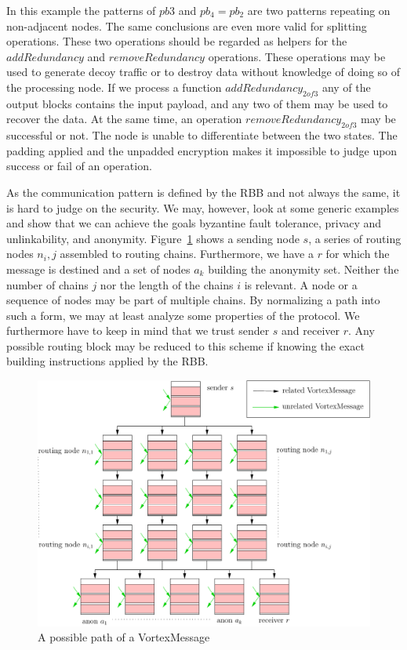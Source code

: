 \documentclass[acmsmall, screen, final, natbib=false]{acmart}
\begin{document}
	In this example the patterns of $pb3$ and $pb_4=pb_2$ are two patterns repeating on non-adjacent nodes. The same conclusions are even more valid for splitting operations. These two operations should be regarded as helpers for the $addRedundancy$ and $removeRedundancy$ operations. These operations may be used to generate decoy traffic or to destroy data without knowledge of doing so of the processing node. If we process a function $addRedundancy_{2 of 3}$ any of the output blocks contains the input payload, and any two of them may be used to recover the data. At the same time, an operation $removeRedundancy_{2 of 3}$ may be successful or not. The node is unable to differentiate between the two states. The padding applied and the unpadded encryption makes it impossible to judge upon success or fail of an operation.
	
	As the communication pattern is defined by the RBB and not always the same, it is hard to judge on the security. We may, however, look at some generic examples and show that we can achieve the goals byzantine fault tolerance, privacy and unlinkability, and anonymity. Figure~\ref{fig:messagePaths} shows a sending node $s$, a series of routing nodes $n_i,j$ assembled to routing chains. Furthermore, we have a $r$ for which the message is destined and a set of nodes $a_k$ building the anonymity set. Neither the number of chains $j$ nor the length of the chains $i$ is relevant. A node or a sequence of nodes may be part of multiple chains. By normalizing a path into such a form, we may at least analyze some properties of the protocol. We furthermore have to keep in mind that we trust sender $s$ and receiver $r$. Any possible routing block may be reduced to this scheme if knowing the exact building instructions applied by the RBB.
	
	\begin{figure}[ht]
		\centering\includegraphics[width=0.7\columnwidth]{messagePaths}
		\caption{A possible path of a VortexMessage}
		\label{fig:messagePaths}
	\end{figure}
	
\end{document}
